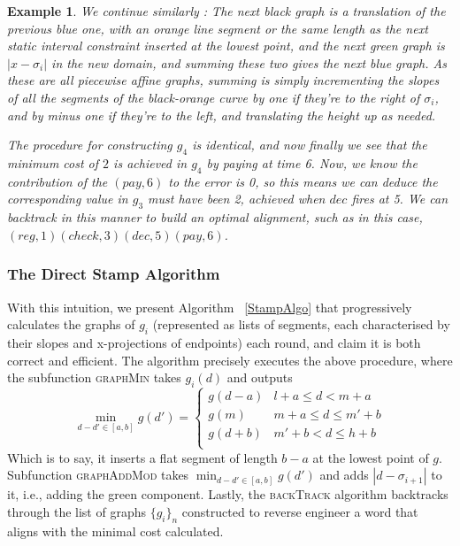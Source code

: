 \documentclass[conference]{IEEEtran}
\newcounter{cases}
\newtheorem{example}{Example}
\begin{document}
\begin{example}
			We continue similarly : The next black graph is a translation of the previous blue one, with an orange line segment or the same length as the next static interval constraint inserted at the lowest point, and the next green graph is $|x-\sigma_i|$ in the new domain, and summing these two gives the next blue graph. 
			As these are all piecewise affine graphs, summing is simply incrementing the slopes of all the segments of the black-orange curve by one if they're to the right of $\sigma_i$, and by minus one if they're to the left, and translating the height up as needed. 
			
			The procedure for constructing $g_4$ is identical, and now finally we see that the minimum cost of $2$ is achieved in $g_4$ by paying at time 6. 
			Now, we know the contribution of the $(pay,6)$ to the error is 0, so this means we can deduce the corresponding value in $g_3$ must have been 2, achieved when $dec$ fires at 5. 
			We can backtrack in this manner to build an optimal alignment, such as in this case, $(reg,1)(check,3)(dec,5)(pay,6)$. 
			
			
		\end{example}
		\subsubsection{The Direct Stamp Algorithm}
		
		With this intuition, we present Algorithm ~\ref{StampAlgo} that progressively calculates the graphs of $g_i$ (represented as lists of segments, each characterised by their slopes and x-projections of endpoints) each round, and claim it is both correct and efficient. 
		The algorithm precisely executes the above procedure, where the subfunction \textsc{graphMin} takes $g_i(d)$ and outputs $$\min_{d-d' \in [a,b]} g(d') = \begin{cases}
			g(d-a) & l + a \leq d < m + a \\
			g(m) & m+a \leq d \leq m' + b \\
			g(d+b) & m' + b < d \leq h + b   \\
		\end{cases}$$ Which is to say, it inserts a flat segment of length $b-a$ at the lowest point of $g$. Subfunction \textsc{graphAddMod} takes $\min_{d-d' \in [a,b]} g(d')$ and adds $|d - \sigma_{i+1}|$ to it, i.e., adding the green component.  Lastly, the \textsc{backTrack} algorithm backtracks through the list of graphs $\{g_i\}_n$ constructed to reverse engineer a word that aligns with the minimal cost calculated. 
		
\end{document}
